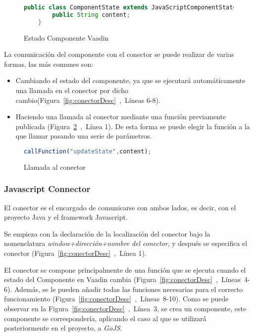 \begin{figure}[!tb]
	\centering
	\begin{lstlisting}[language=Java]
	public class ComponentState	extends JavaScriptComponentState {
		public String content;
	}\end{lstlisting}
	\caption{Estado Componente Vaadin}
	\label{fig:estadoComponenteVaadin}
\end{figure}


La comunicación del componente con el conector se puede realizar de varias formas, las más comunes son:
\begin{itemize}
	\item  Cambiando el estado del componente, ya que se ejecutará automáticamente una llamada en el conector por dicho cambio(Figura~\ref{fig:conectorDesc}~,~Líneas 6-8).
	\item  Haciendo una llamada al conector mediante una función previamente publicada (Figura~\ref{fig:callfunction}~,~Línea 1). De esta forma se puede elegir la función a la que llamar pasando una serie de parámetros.
\end{itemize}

\begin{figure}[!tb]
	\centering
	\begin{lstlisting}[language=JavaScript]
	callFunction("updateState",content);
	\end{lstlisting}
	\caption{Llamada al conector}
	\label{fig:callfunction}
\end{figure}



\subsubsection{Javascript Connector}	


El conector es el encargado de comunicarse con ambos lados, es decir, con el proyecto Java y el framework Javascript.

Se empieza con la declaración de la localización del conector bajo la nomenclatura \emph{window+dirección+nombre del conector}, y después se especifica el conector (Figura~\ref{fig:conectorDesc}~,~Línea 1).

El conector se compone principalmente de una función que se ejecuta cuando el estado del Componente en Vaadin cambia (Figura~\ref{fig:conectorDesc}~,~Líneas~4-6). Además, se le pueden añadir todas las funciones necesarias para el correcto funcionamiento (Figura~\ref{fig:conectorDesc}~,~Líneas~8-10). Como se puede observar en la Figura~\ref{fig:conectorDesc}~,~Línea~3, se crea un componente, este componente se correspondería, aplicando el caso al que se utilizará posteriormente en el proyecto, a \emph{GoJS}.



